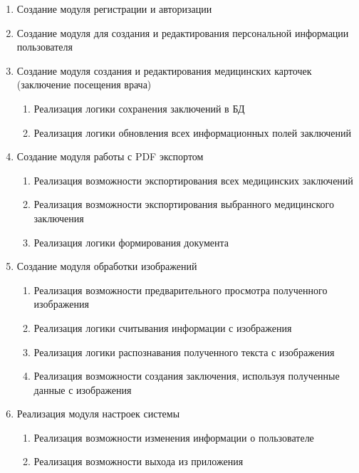 \begin{enumerate}
\item Создание модуля регистрации и авторизации
\item Создание модуля для создания и редактирования персональной информации пользователя
\item Создание модуля создания и редактирования медицинских карточек (заключение посещения врача)
\begin{enumerate}
\item Реализация логики сохранения заключений в БД
\item Реализация логики обновления всех информационных полей заключений
\end{enumerate}
\item Создание модуля работы с PDF экспортом
\begin{enumerate}
\item Реализация возможности экспортирования всех медицинских заключений
\item Реализация возможности экспортирования выбранного медицинского заключения
\item Реализация логики формирования документа
\end{enumerate}
\item Создание модуля обработки изображений
\begin{enumerate}
\item Реализация возможности предварительного просмотра полученного изображения
\item Реализация логики считывания информации с изображения
\item Реализация логики распознавания полученного текста с изображения
\item Реализация возможности создания заключения, используя полученные данные с изображения
\end{enumerate}
\item Реализация модуля настроек системы
\begin{enumerate}
\item Реализация возможности изменения информации о пользователе
\item Реализация возможности выхода из приложения
\end{enumerate}
\end{enumerate}
